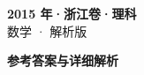 \documentclass[zihao=-4, a4paper]{ctexart}
\begin{document}
\begin{center}
  {\Large\bfseries 2015 年·浙江卷·理科}\\[4pt]
  {\large 数学 · 解析版}
\end{center}
\medskip
{}

\clearpage
{}
\begin{center}{\Large\bfseries 参考答案与详细解析}\end{center}
\medskip

\end{document}
